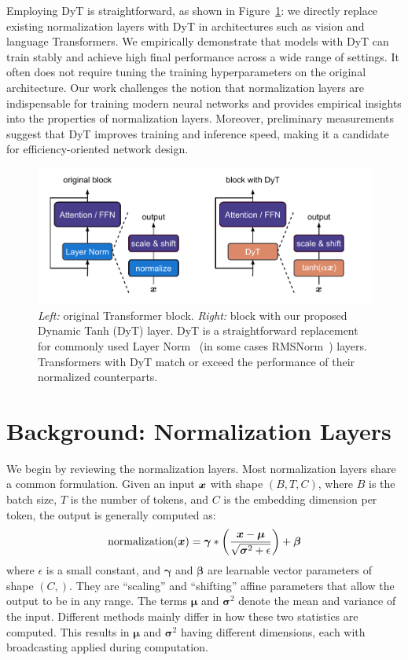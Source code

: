 Employing DyT is straightforward, as shown in Figure~\ref{figure:before_after}: we directly replace existing normalization layers with DyT in architectures such as vision and language Transformers. We empirically demonstrate that models with DyT can train stably and achieve high final performance across a wide range of settings.
It often does not require tuning the training hyperparameters on the original architecture. 
Our work challenges the notion that normalization layers are indispensable for training modern neural networks and provides empirical insights into the properties of normalization layers.
Moreover, preliminary measurements suggest that DyT improves training and inference speed, making it a candidate for efficiency-oriented network design.

\begin{figure}[t]
\centering
\vspace{0.4in}
\includegraphics[width=0.7\linewidth]{figures/before_after.pdf}
\caption{\emph{Left:} original Transformer block. \emph{Right:} block with our proposed Dynamic Tanh (DyT) layer. DyT is a straightforward replacement for commonly used Layer Norm~\citep{ba2016layer} (in some cases RMSNorm~\citep{zhang2019root}) layers. Transformers with DyT match or exceed the performance of their normalized counterparts.}
\label{figure:before_after}
\end{figure}



\section{Background: Normalization Layers}


We begin by reviewing the normalization layers. 
Most normalization layers share a common formulation.
Given an input ${\bm{x}}$ with shape $(B, T, C)$, where $B$ is the batch size, $T$ is the number of tokens, and $C$ is the embedding dimension per token, the output is generally computed as: 
\begin{equation}
\mathrm{normalization}({\bm{x}}) = \bm \gamma * \left ( \frac{{\bm{x}} - \bm \mu}{\sqrt{\bm \sigma^2 + \epsilon }}  \right ) + \bm \beta
\end{equation}
where $\epsilon$ is a small constant, and $\bm \gamma$ and $\bm \beta$ are learnable vector parameters of shape $(C,)$. They are ``scaling'' and ``shifting'' affine parameters that allow the output to be in any range.
The terms $\bm \mu$ and $\bm \sigma^2$ denote the mean and variance of the input. Different methods mainly differ in how these two statistics are computed. This results in $\bm \mu$ and $\bm \sigma^2$ having different dimensions, each with broadcasting applied during computation.

